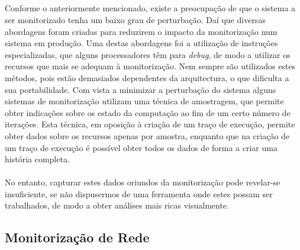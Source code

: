 \subparagraph*{
}
Conforme o anteriormente mencionado, existe a preocupação de que o sistema a ser monitorizado tenha um baixo grau de perturbação.
Daí que diversas abordagens foram criadas para reduzirem o impacto da monitorização num sistema em produção.
Uma destas abordagens foi a utilização de instruções especializadas, que alguns processadores têm para \textit{debug}, de modo a utilizar os recursos que mais se adequam à monitorização.
Nem sempre são utilizados estes métodos, pois estão demasiados dependentes da arquitectura, o que dificulta a sua portabilidade.
Com vista a minimizar a perturbação do sistema alguns sistemas de monitorização utilizam uma técnica de amostragem, que permite obter indicações sobre os estado da computação ao fim de um certo número de iterações.
Esta técnica, em oposição à criação de um traço de execução, permite obter dados sobre os recursos apenas por amostra, enquanto que na criação de um traço de execução é possível obter todos os dados de forma a criar uma história completa.

\paragraph*{
}
No entanto, capturar estes dados oriundos da monitorização pode revelar-se insuficiente, se não dispusermos de uma ferramenta onde estes possam ser trabalhados, de modo a obter análises mais ricas visualmente.

\subsection{Monitorização de Rede}\label{sect:packet_capture}

